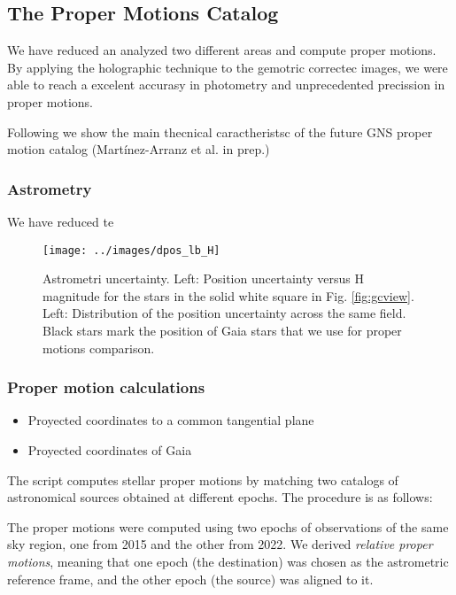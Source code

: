 \documentclass{aa} %
\begin{document}
	 \subsection{The Proper Motions Catalog}
	 
	We have reduced an analyzed two different areas and compute proper motions. By applying the holographic technique \citep{Holography} to the gemotric correctec images, we were able to reach a excelent accurasy in photometry and unprecedented precission in proper motions. 
	 
	 Following we show the main thecnical caractheristsc of the future GNS proper motion catalog (Martínez-Arranz et al. in prep.)
	 
	 \subsubsection{Astrometry} 
	 
	 We have reduced te 
	 
	 \begin{figure}
	 	\centering
	 	\texttt{[image: ../images/dpos\_lb\_H]}
	 	\caption{Astrometri uncertainty. Left: Position uncertainty versus H magnitude for the stars in the solid white square in Fig. \ref{fig:gcview}. Left: Distribution of the position uncertainty across the same field. Black stars mark the position of Gaia stars that we use for proper motions comparison.}
	 	\label{fig:dposhgns1}
	 \end{figure}
	 
	 \subsubsection{Proper motion calculations}
	 
	 \begin{itemize}
	 	\item Proyected coordinates to a common tangential plane
	 		\item Proyected coordinates of Gaia
	 \end{itemize}
	 
	 
	 The script computes stellar proper motions by matching two catalogs of astronomical sources obtained at different epochs. The procedure is as follows:
	 
	The proper motions were computed using two epochs of observations of the same sky region, one from 2015 and the other from 2022. We derived \textit{relative proper motions}, meaning that one epoch (the destination) was chosen as the astrometric reference frame, and the other epoch (the source) was aligned to it. 
	
\end{document}
